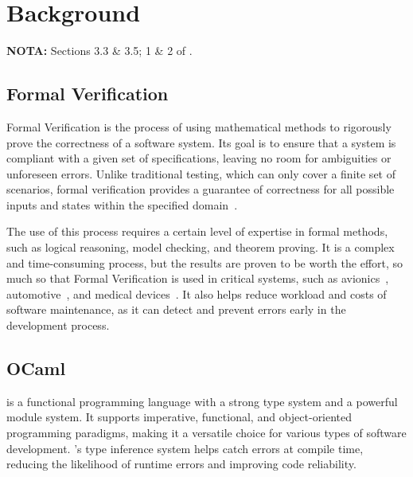
%

\chapter{Background}
\label{cha:background}

\textbf{NOTA:} Sections 3.3 \& 3.5; 1 \& 2 of \cite{Brian_Polgreen2025}.

\section{Formal Verification}
\label{sec:formal_verification}

Formal Verification is the process of using mathematical methods to rigorously 
prove the correctness of a software system. Its goal is to ensure that a system 
is compliant with a given set of specifications, leaving no room for ambiguities or 
unforeseen errors. Unlike traditional testing, which can only cover a 
finite set of scenarios, formal verification provides a guarantee of 
correctness for all possible inputs and states within the specified domain~\cite{Brian_Polgreen2025}.

The use of this process requires a certain level of expertise in formal methods, such as 
logical reasoning, model checking, and theorem proving. It is a complex and time-consuming 
process, but the results are proven to be worth the effort, so much so that Formal Verification 
is used in critical systems, such as avionics~\cite{Yin_Yongfeng2010}, automotive~\cite{Rajabli_Nijat2021}, 
and medical devices~\cite{Bezerra_Jonas_Santos2016}. It also helps reduce workload and costs 
of software maintenance, as it can detect and prevent errors early in the development process.

\section{OCaml}
\label{sec:ocaml}

\ocaml is a functional programming language with a strong type system and a powerful
module system. It supports imperative, functional, and object-oriented programming 
paradigms, making it a versatile choice for various types of software development. 
\ocaml's type inference system helps catch errors at compile time, reducing the 
likelihood of runtime errors and improving code reliability.

